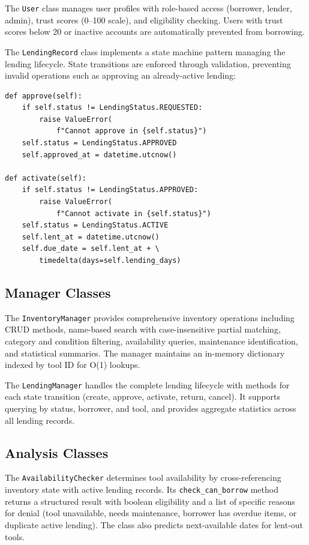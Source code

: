 \documentclass[conference]{IEEEtran}
\begin{document}
The \texttt{User} class manages user profiles with role-based access (borrower, lender, admin), trust scores (0--100 scale), and eligibility checking. Users with trust scores below 20 or inactive accounts are automatically prevented from borrowing.

The \texttt{LendingRecord} class implements a state machine pattern managing the lending lifecycle. State transitions are enforced through validation, preventing invalid operations such as approving an already-active lending:

\begin{lstlisting}[caption={Lending state machine with validation}]
def approve(self):
    if self.status != LendingStatus.REQUESTED:
        raise ValueError(
            f"Cannot approve in {self.status}")
    self.status = LendingStatus.APPROVED
    self.approved_at = datetime.utcnow()

def activate(self):
    if self.status != LendingStatus.APPROVED:
        raise ValueError(
            f"Cannot activate in {self.status}")
    self.status = LendingStatus.ACTIVE
    self.lent_at = datetime.utcnow()
    self.due_date = self.lent_at + \
        timedelta(days=self.lending_days)
\end{lstlisting}

\subsection{Manager Classes}

The \texttt{InventoryManager} provides comprehensive inventory operations including CRUD methods, name-based search with case-insensitive partial matching, category and condition filtering, availability queries, maintenance identification, and statistical summaries. The manager maintains an in-memory dictionary indexed by tool ID for O(1) lookups.

The \texttt{LendingManager} handles the complete lending lifecycle with methods for each state transition (create, approve, activate, return, cancel). It supports querying by status, borrower, and tool, and provides aggregate statistics across all lending records.

\subsection{Analysis Classes}

The \texttt{AvailabilityChecker} determines tool availability by cross-referencing inventory state with active lending records. Its \texttt{check\_can\_borrow} method returns a structured result with boolean eligibility and a list of specific reasons for denial (tool unavailable, needs maintenance, borrower has overdue items, or duplicate active lending). The class also predicts next-available dates for lent-out tools.
\end{document}
